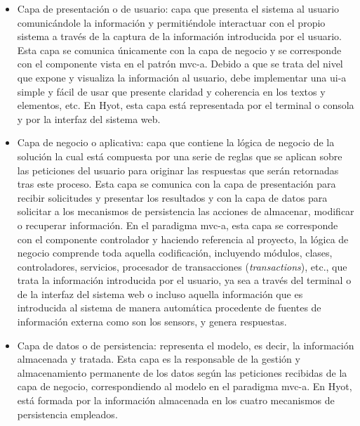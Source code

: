 \documentclass[12pt,a4paper, twoside]{report}
\begin{document}
	\begin{itemize}
		\item Capa de presentación o de usuario: capa que presenta el sistema al usuario comunicándole la información y permitiéndole interactuar con el propio sistema a través de la captura de la información introducida por el usuario. Esta capa se comunica únicamente con la capa de negocio y se corresponde con el componente vista en el patrón \gls{mvc-a}. Debido a que se trata del nivel que expone y visualiza la información al usuario, debe implementar una \gls{ui-a} simple y fácil de usar que presente claridad y coherencia en los textos y elementos, etc. En Hyot, esta capa está representada por el terminal o consola y por la interfaz del sistema web.
	
		\item Capa de negocio o aplicativa: capa que contiene la lógica de negocio de la solución la cual está compuesta por una serie de reglas que se aplican sobre las peticiones del usuario para originar las respuestas que serán retornadas tras este proceso. Esta capa se comunica con la capa de presentación para recibir solicitudes y presentar los resultados y con la capa de datos para solicitar a los mecanismos de persistencia las acciones de almacenar, modificar o recuperar información. En el paradigma \gls{mvc-a}, esta capa se corresponde con el componente controlador y haciendo referencia al proyecto, la lógica de negocio comprende toda aquella codificación, incluyendo módulos, clases, controladores, servicios, procesador de transacciones (\textit{\glspl{transaction}}), etc., que trata la información introducida por el usuario, ya sea a través del terminal o de la interfaz del sistema web o incluso aquella información que es introducida al sistema de manera automática procedente de fuentes de información externa como son los \glspl{sensor}, y genera respuestas.
		
		\item Capa de datos o de persistencia: representa el modelo, es decir, la información almacenada y tratada. Esta capa es la responsable de la gestión y almacenamiento permanente de los datos según las peticiones recibidas de la capa de negocio, correspondiendo al modelo en el paradigma \gls{mvc-a}. En Hyot, está formada por la información almacenada en los cuatro mecanismos de persistencia empleados.		 
	\end{itemize} 	
	
\end{document}
